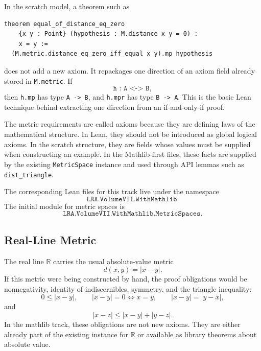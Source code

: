 \begin{example*}
In the scratch model, a theorem such as
\begin{verbatim}
theorem equal_of_distance_eq_zero
    {x y : Point} (hypothesis : M.distance x y = 0) :
    x = y :=
  (M.metric.distance_eq_zero_iff_equal x y).mp hypothesis
\end{verbatim}
does not add a new axiom. It repackages one direction of an axiom field already
stored in \texttt{M.metric}. If
\[
  \texttt{h : A <-> B},
\]
then \texttt{h.mp} has type \texttt{A -> B}, and \texttt{h.mpr} has type
\texttt{B -> A}. This is the basic Lean technique behind extracting one
direction from an if-and-only-if proof.
\end{example*}

\begin{remark*}
The metric requirements are called axioms because they are defining laws of the
mathematical structure. In Lean, they should not be introduced as global
logical axioms. In the scratch structure, they are fields whose values must be
supplied when constructing an example. In the Mathlib-first files, these facts
are supplied by the existing \texttt{MetricSpace} instance and used through
API lemmas such as \texttt{dist\_triangle}.
\end{remark*}

\begin{remark*}[Namespace]
The corresponding Lean files for this track live under the namespace
\[
  \texttt{LRA.VolumeVII.WithMathlib}.
\]
The initial module for metric spaces is
\[
  \texttt{LRA.VolumeVII.WithMathlib.MetricSpaces}.
\]
\end{remark*}

\subsection{Real-Line Metric}

\begin{example*}
The real line $\mathbb{R}$ carries the usual absolute-value metric
\[
  d(x,y)=|x-y|.
\]
If this metric were being constructed by hand, the proof obligations would be
nonnegativity, identity of indiscernibles, symmetry, and the triangle
inequality:
\[
  0\le |x-y|,\qquad
  |x-y|=0\iff x=y,\qquad
  |x-y|=|y-x|,
\]
and
\[
  |x-z|\le |x-y|+|y-z|.
\]
In the mathlib track, these obligations are not new axioms. They are either
already part of the existing instance for \(\mathbb{R}\) or available as
library theorems about absolute value.
\end{example*}

